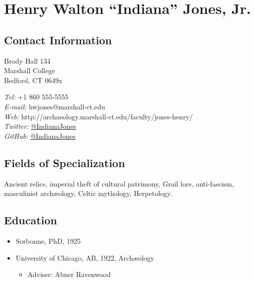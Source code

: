 \documentclass[%
    11pt,
  oneside
  ]{memoir}
\let\oldsection\section
\renewcommand{\section}[1]{%
  \oldsection{#1}
  \leavevmode
  \par
  \vspace{\dimexpr-\baselineskip-\parskip}
}
\begin{document}
      \chapter*{Henry Walton ``Indiana'' Jones, Jr.}
  

  \hypertarget{contact-information}{
  \section{Contact Information}\label{contact-information}}
    \begin{minipage}[t]{0.3\textwidth}
      Brody Hall 134\\ Marshall College\\ Bedford, CT 0649x
    \end{minipage}
    \begin{minipage}[t]{0.7\textwidth}
                {\textit{Tel:}} +1 860 555-5555 \\
                        {\textit{E-mail:}} hwjones@marshall-ct.edu \\
                        {\textit{Web:}} http://archaeology.marshall-ct.edu/faculty/jones-henry/ \\
                        {\textit{Twitter:}} \href{http://twitter.com/IndianaJones}{@IndianaJones} \\
                        {\textit{GitHub:}} \href{http://github.com/IndianaJones}{@IndianaJones}
            \end{minipage}
\vspace{-\baselineskip} %
\hypertarget{fields-of-specialization}{%
\section{Fields of Specialization}\label{fields-of-specialization}}

Ancient relics, imperial theft of cultural patrimony, Grail lore,
anti-fascism, masculinist archæology, Celtic mythology, Herpetology.

\hypertarget{education}{%
\section{Education}\label{education}}

\begin{itemize}
\tightlist
\item
  Sorbonne, PhD, 1925
\item
  University of Chicago, AB, 1922, Archæology

  \begin{itemize}
  \tightlist
  \item
    Adviser: Abner Ravenwood
  \end{itemize}
\end{itemize}
\end{document}
